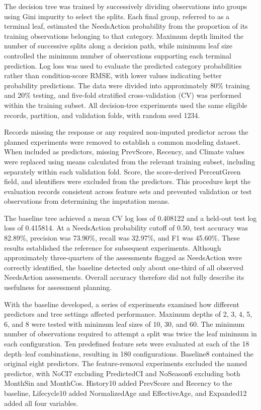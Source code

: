\documentclass[NewProceedings,letterpaper,NoPageNumbers,NoLineNumbers, DoubleSpace]{ascelike-new}
\begin{document}
The decision tree was trained by successively dividing observations into groups using Gini impurity to select the splits. Each final group, referred to as a terminal leaf, estimated the NeedsAction probability from the proportion of its training observations belonging to that category. Maximum depth limited the number of successive splits along a decision path, while minimum leaf size controlled the minimum number of observations supporting each terminal prediction. Log loss was used to evaluate the predicted category probabilities rather than condition-score RMSE, with lower values indicating better probability predictions. The data were divided into approximately 80\% training and 20\% testing, and five-fold stratified cross-validation (CV) was performed within the training subset. All decision-tree experiments used the same eligible records, partition, and validation folds, with random seed 1234.

Records missing the response or any required non-imputed predictor across the planned experiments were removed to establish a common modeling dataset. When included as predictors, missing PrevScore, Recency, and Climate values were replaced using means calculated from the relevant training subset, including separately within each validation fold. Score, the score-derived PercentGreen field, and identifiers were excluded from the predictors. This procedure kept the evaluation records consistent across feature sets and prevented validation or test observations from determining the imputation means.

The baseline tree achieved a mean CV log loss of 0.408122 and a held-out test log loss of 0.415814. At a NeedsAction probability cutoff of 0.50, test accuracy was 82.89\%, precision was 73.90\%, recall was 32.97\%, and F1 was 45.60\%. These results established the reference for subsequent experiments. Although approximately three-quarters of the assessments flagged as NeedsAction were correctly identified, the baseline detected only about one-third of all observed NeedsAction assessments. Overall accuracy therefore did not fully describe its usefulness for assessment planning.

With the baseline developed, a series of experiments examined how different predictors and tree settings affected performance. Maximum depths of 2, 3, 4, 5, 6, and 8 were tested with minimum leaf sizes of 10, 30, and 60. The minimum number of observations required to attempt a split was twice the leaf minimum in each configuration. Ten predefined feature sets were evaluated at each of the 18 depth--leaf combinations, resulting in 180 configurations. Baseline8 contained the original eight predictors. The feature-removal experiments excluded the named predictor, with NoCI7 excluding PredictedCI and NoSeason6 excluding both MonthSin and MonthCos. History10 added PrevScore and Recency to the baseline, Lifecycle10 added NormalizedAge and EffectiveAge, and Expanded12 added all four variables.
\end{document}
